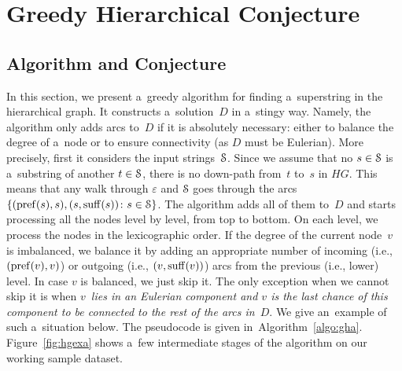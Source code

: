 \section{Greedy Hierarchical Conjecture}
\subsection{Algorithm and Conjecture}
In this section, we present a~greedy algorithm for
finding a~superstring in the hierarchical graph. 
It constructs a~solution~$D$ in a~stingy way. 
Namely, the algorithm only adds arcs to~$D$ 
if it is absolutely necessary: either to balance the degree of a~node or to ensure connectivity 
(as $D$ must be Eulerian). 
More precisely, first it considers the input
strings~${\cal S}$. Since we assume that 
no $s \in {\cal S}$ is a~substring of another 
$t \in {\cal S}$, there is no down-path from~$t$ to~$s$ in $HG$. 
This means that any walk through $\varepsilon$ and ${\cal S}$ goes through the arcs $\{(\operatorname{pref}(s), s), (s, \operatorname{suff}(s)) \colon s \in {\cal S}\}$. The algorithm adds all of them to~$D$ and starts processing all the nodes level by level, from top to bottom. On each level, we process the nodes in the lexicographic order. If the degree of the current node~$v$ is imbalanced, we balance it by adding an appropriate number of incoming (i.e., $(\operatorname{pref}(v),v)$) or outgoing (i.e., $(v, \operatorname{suff}(v))$) arcs from the previous (i.e., lower) level. In case $v$ is balanced, we just skip it. The only exception when we cannot skip it is when {\em $v$~lies in an Eulerian component and $v$ is the last chance of this component to be connected to the rest of the arcs in~$D$}. We give an~example of such a~situation below. The pseudocode is given in~Algorithm~\ref{algo:gha}. Figure~\ref{fig:hgexa} shows a~few intermediate stages of the algorithm on our working sample dataset.


